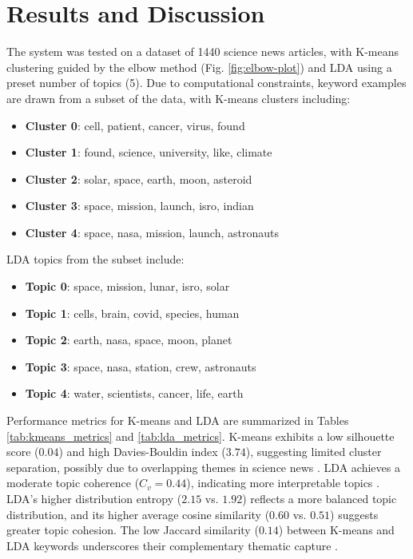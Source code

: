 \documentclass[conference]{IEEEtran}
\begin{document}
\section{Results and Discussion}
The system was tested on a dataset of 1440 science news articles, with K-means clustering guided by the elbow method (Fig. \ref{fig:elbow-plot}) and LDA using a preset number of topics (5). Due to computational constraints, keyword examples are drawn from a subset of the data, with K-means clusters including:
\begin{itemize}
    \item \textbf{Cluster 0}: cell, patient, cancer, virus, found
    \item \textbf{Cluster 1}: found, science, university, like, climate
    \item \textbf{Cluster 2}: solar, space, earth, moon, asteroid
    \item \textbf{Cluster 3}: space, mission, launch, isro, indian
    \item \textbf{Cluster 4}: space, nasa, mission, launch, astronauts
\end{itemize}
LDA topics from the subset include:
\begin{itemize}
    \item \textbf{Topic 0}: space, mission, lunar, isro, solar
    \item \textbf{Topic 1}: cells, brain, covid, species, human
    \item \textbf{Topic 2}: earth, nasa, space, moon, planet
    \item \textbf{Topic 3}: space, nasa, station, crew, astronauts
    \item \textbf{Topic 4}: water, scientists, cancer, life, earth
\end{itemize}
Performance metrics for K-means and LDA are summarized in Tables \ref{tab:kmeans_metrics} and \ref{tab:lda_metrics}. K-means exhibits a low silhouette score ($0.04$) and high Davies-Bouldin index ($3.74$), suggesting limited cluster separation, possibly due to overlapping themes in science news \cite{rousseeuw1987silhouettes,davies1979cluster}. LDA achieves a moderate topic coherence ($C_v = 0.44$), indicating more interpretable topics \cite{roder2015exploring}. LDA’s higher distribution entropy ($2.15$ vs. $1.92$) reflects a more balanced topic distribution, and its higher average cosine similarity ($0.60$ vs. $0.51$) suggests greater topic cohesion. The low Jaccard similarity ($0.14$) between K-means and LDA keywords underscores their complementary thematic capture \cite{jaccard1912distribution}.
\end{document}
